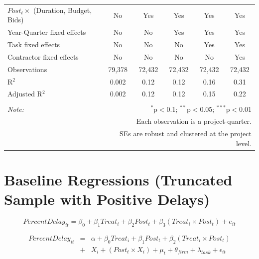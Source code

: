 \documentclass[
]{article}
\begin{document}
\begin{table}[H]
\begin{tabular}{@{\extracolsep{-2pt}}lccccc}
$Post_t \times$  (Duration, Budget, Bids) & No & Yes & Yes & Yes & Yes \\ 
Year-Quarter fixed effects & No & No & Yes & Yes & Yes \\ 
Task fixed effects & No & No & No & Yes & Yes \\ 
Contractor fixed effects & No & No & No & No & Yes \\ 
Observations & 79,378 & 72,432 & 72,432 & 72,432 & 72,432 \\ 
R$^{2}$ & 0.002 & 0.12 & 0.12 & 0.16 & 0.31 \\ 
Adjusted R$^{2}$ & 0.002 & 0.12 & 0.12 & 0.15 & 0.22 \\ 
\hline 
\hline \\[-1.8ex] 
\textit{Note:}  & \multicolumn{5}{r}{$^{*}$p$<$0.1; $^{**}$p$<$0.05; $^{***}$p$<$0.01} \\ 
 & \multicolumn{5}{r}{Each observation is a project-quarter.} \\ 
 & \multicolumn{5}{r}{SEs are robust and clustered at the project level.} \\ 
\end{tabular} 
\end{table}

\hypertarget{baseline-regressions-truncated-sample-with-positive-delays}{%
\section{Baseline Regressions (Truncated Sample with Positive
Delays)}\label{baseline-regressions-truncated-sample-with-positive-delays}}

\[ PercentDelay_{it} = \beta_0 + \beta_1 Treat_i + \beta_2 Post_t + \beta_3 (Treat_i \times Post_t) + e_{it}\]

\[ \begin{aligned} PercentDelay_{it} &=& \alpha+\beta_0 Treat_i + \beta_1 Post_t + \beta_2 (Treat_i \times Post_t)\\
&+&  X_i + (Post_t \times X_i) + \mu_t + \theta_{firm} + \lambda_{task}+ \epsilon_{it}
\end{aligned}\]
\end{document}
